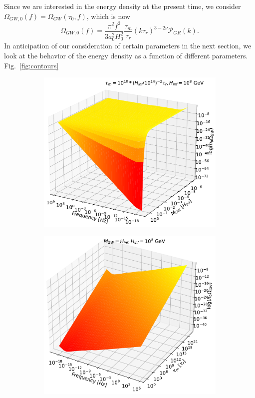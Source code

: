 \documentclass[prd,twocolumn,aps,psfig,nofootinbib,nobibnotes,superscriptaddress,preprintnumbers,times]{revtex4-2}
\begin{document}
Since we are interested in the energy density at the present time, we consider $\Omega_{GW,0}(f) = \Omega_{GW}(\tau_0,f)$, which is now
\begin{equation}\label{eqn:om_gw_0}
    \Omega_{GW,0}(f) = \frac{\pi^2f^2}{3a_0^2 H_0^2}\frac{\tau_m}{\tau_r}(k\tau_r)^{3-2\nu}\mathcal{P}_{GR}(k) .
\end{equation}
In anticipation of our consideration of certain parameters in the next section, we look at the behavior of the energy density as a function of different parameters. Fig.\ \ref{fig:contours}
\begin{figure}[H]
\begin{subfigure}{.5\textwidth}
  \centering
  \includegraphics[width=.82\linewidth]{fig/fig4a.pdf}  
  \label{fig:contour-a}
\end{subfigure}
\begin{subfigure}{.5\textwidth}
  \centering
  \includegraphics[width=.82\linewidth]{fig/fig4b.pdf}  

\end{subfigure}
\end{figure}
\end{document}
